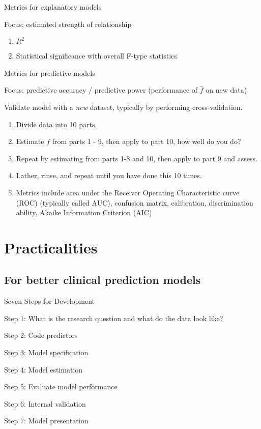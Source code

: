 \documentclass[10pt,ignorenonframetext,]{beamer}
\providecommand{\tightlist}{%
\setlength{\itemsep}{0pt}\setlength{\parskip}{0pt}}
\begin{document}
\begin{frame}{Metrics for explanatory models}

Focus: estimated strength of relationship

\begin{enumerate}[<+->]
\def\labelenumi{\arabic{enumi}.}
\tightlist
\item
  \(R^2\)
\item
  Statistical significance with overall F-type statistics
\end{enumerate}

\end{frame}

\begin{frame}{Metrics for predictive models}

Focus: predictive accuracy / predictive power (performance of
\(\hat{f}\) on new data)

Validate model with a \emph{new} dataset, typically by performing
cross-validation.

\begin{enumerate}[<+->]
\def\labelenumi{\arabic{enumi}.}
\tightlist
\item
  Divide data into 10 parts.
\item
  Estimate \(f\) from parts 1 - 9, then apply to part 10, how well do
  you do?
\item
  Repeat by estimating from parts 1-8 and 10, then apply to part 9 and
  assess.
\item
  Lather, rinse, and repeat until you have done this 10 times.
\item
  Metrics include area under the Receiver Operating Characteristic curve
  (ROC) (typically called AUC), confusion matrix, calibration,
  discrimination ability, Akaike Information Criterion (AIC)
\end{enumerate}

\end{frame}

\section{Practicalities}\label{practicalities}

\subsection{For better clinical prediction
models}\label{for-better-clinical-prediction-models}

\begin{frame}{Seven Steps for Development}

Step 1: What is the research question and what do the data look like?

Step 2: Code predictors

Step 3: Model specification

Step 4: Model estimation

Step 5: Evaluate model performance

Step 6: Internal validation

Step 7: Model presentation

\end{frame}
\end{document}
